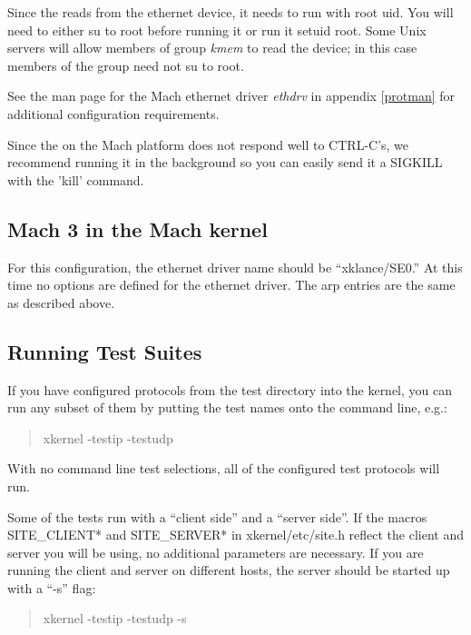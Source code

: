 Since the \xk{} reads from the ethernet device, it needs to run with
root uid.  You will need to either su to root before running it or run
it setuid root.  Some Unix servers will allow members of group {\em kmem}
to read the device; in this case members of the group need not su to root.

See the man page for the Mach ethernet driver {\em ethdrv} in appendix
\ref{protman} for
additional configuration requirements.

Since the \xk{} on the Mach platform does not respond well to
CTRL-C's, we recommend running it in the background so you can easily
send it a SIGKILL with the 'kill' command.


\subsection{Mach 3 \xk{} in the Mach kernel}

For this configuration, the ethernet driver name should be
``xklance/SE0.''  At this time no options are defined for the ethernet
driver.  The arp entries are the same as described above.


\subsection{Running Test Suites}
If you have configured protocols from the {\sanss test} directory into
the kernel, you can run any subset of them by putting the test names
onto the command line, e.g.:

\begin{quote}
\begin{tt}
xkernel -testip -testudp
\end{tt}
\end{quote}

With no command line test selections, all of the configured test protocols
will run.

Some of the tests run with a ``client side'' and a ``server side''.
If the macros SITE\_CLIENT* and SITE\_SERVER* in xkernel/etc/site.h
reflect the client and server you will be using, no additional
parameters are necessary.  If you are running the client and server
on different hosts, the server should be started up with a ``-s''
flag:

\begin{quote}
\begin{tt}
xkernel -testip -testudp -s
\end{tt}
\end{quote}

